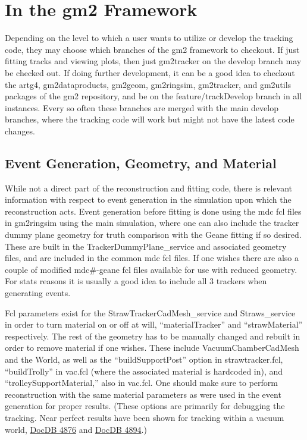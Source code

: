 \section{In the gm2 Framework}

  Depending on the level to which a user wants to utilize or develop the tracking code, they may choose which branches of the gm2 framework to checkout. If just fitting tracks and viewing plots, then just gm2tracker on the develop branch may be checked out. If doing further development, it can be a good idea to checkout the artg4, gm2dataproducts, gm2geom, gm2ringsim, gm2tracker, and gm2utils packages of the gm2 repository, and be on the feature/trackDevelop branch in all instances. Every so often these branches are merged with the main develop branches, where the tracking code will work but might not have the latest code changes. 

  \subsection{Event Generation, Geometry, and Material}

    While not a direct part of the reconstruction and fitting code, there is relevant information with respect to event generation in the simulation upon which the reconstruction acts. Event generation before fitting is done using the mdc fcl files in gm2ringsim using the main simulation, where one can also include the tracker dummy plane geometry for truth comparison with the Geane fitting if so desired. These are built in the TrackerDummyPlane\_service and associated geometry files, and are included in the common mdc fcl files. If one wishes there are also a couple of modified mdc\#-geane fcl files available for use with reduced geometry. For stats reasons it is usually a good idea to include all 3 trackers when generating events.

    Fcl parameters exist for the StrawTrackerCadMesh\_service and Straws\_service in order to turn material on or off at will, ``materialTracker'' and ``strawMaterial'' respectively. The rest of the geometry has to be manually changed and rebuilt in order to remove material if one wishes. These include VacuumChamberCadMesh and the World, as well as the ``buildSupportPost'' option in strawtracker.fcl, ``buildTrolly'' in vac.fcl (where the associated material is hardcoded in), and ``trolleySupportMaterial,'' also in vac.fcl. One should make sure to perform reconstruction with the same material parameters as were used in the event generation for proper results. (These options are primarily for debugging the tracking. Near perfect results have been shown for tracking within a vacuum world, \href{http://gm2-docdb.fnal.gov:8080/cgi-bin/ShowDocument?docid=4876}{DocDB 4876} and \href{http://gm2-docdb.fnal.gov:8080/cgi-bin/ShowDocument?docid=4894}{DocDB 4894}.)


